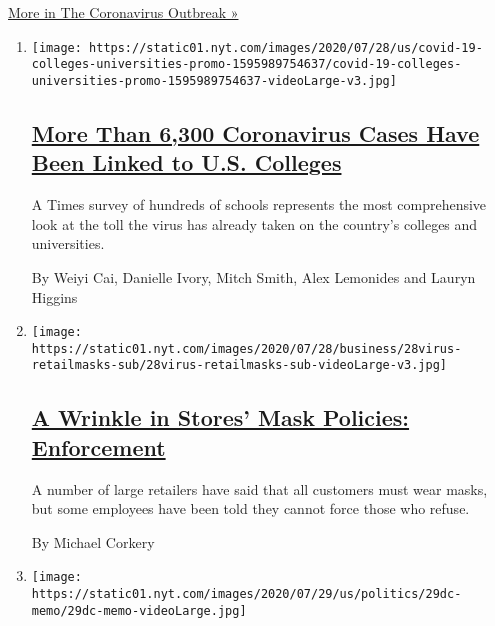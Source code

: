 \href{/news-event/coronavirus}{More in The Coronavirus Outbreak »}

\begin{enumerate}
\def\labelenumi{\arabic{enumi}.}
\item
  \texttt{[image: https://static01.nyt.com/images/2020/07/28/us/covid-19-colleges-universities-promo-1595989754637/covid-19-colleges-universities-promo-1595989754637-videoLarge-v3.jpg]}

  \hypertarget{more-than-6300-coronavirus-cases-have-been-linked-to-us-colleges}{%
  \subsection{\texorpdfstring{\href{/interactive/2020/07/28/us/covid-19-colleges-universities.html}{More
  Than 6,300 Coronavirus Cases Have Been Linked to U.S.
  Colleges}}{More Than 6,300 Coronavirus Cases Have Been Linked to U.S. Colleges}}\label{more-than-6300-coronavirus-cases-have-been-linked-to-us-colleges}}

  A Times survey of hundreds of schools represents the most
  comprehensive look at the toll the virus has already taken on the
  country's colleges and universities.

  By Weiyi Cai, Danielle Ivory, Mitch Smith, Alex Lemonides and Lauryn
  Higgins
\item
  \texttt{[image: https://static01.nyt.com/images/2020/07/28/business/28virus-retailmasks-sub/28virus-retailmasks-sub-videoLarge-v3.jpg]}

  \hypertarget{a-wrinkle-in-stores-mask-policies-enforcement}{%
  \subsection{\texorpdfstring{\href{/2020/07/29/business/coronavirus-masks-stores-walmart.html}{A
  Wrinkle in Stores' Mask Policies:
  Enforcement}}{A Wrinkle in Stores' Mask Policies: Enforcement}}\label{a-wrinkle-in-stores-mask-policies-enforcement}}

  A number of large retailers have said that all customers must wear
  masks, but some employees have been told they cannot force those who
  refuse.

  By Michael Corkery
\item
  \texttt{[image: https://static01.nyt.com/images/2020/07/29/us/politics/29dc-memo/29dc-memo-videoLarge.jpg]}

  \hypertarget{divided-and-demoralized-on-virus-aid-republicans-ask-whats-in-the-bill}{%
}
\end{enumerate}
